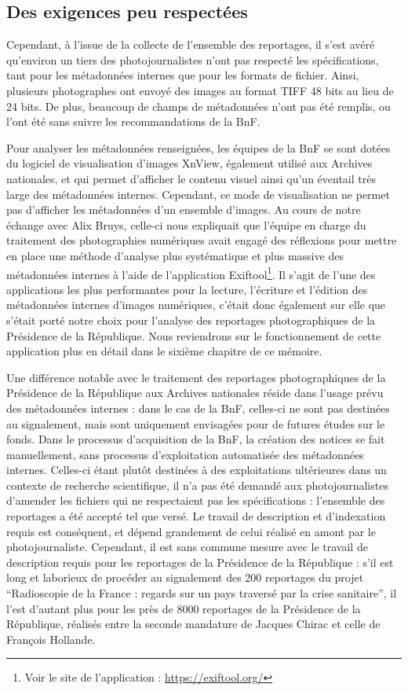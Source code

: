 \subsection*{Des exigences peu respectées}

Cependant, à l'issue de la collecte de l'ensemble des reportages, il s'est avéré qu'environ un tiers des photojournalistes n'ont pas respecté les spécifications, tant pour les métadonnées internes que pour les formats de fichier. Ainsi, plusieurs photographes ont envoyé des images au format TIFF 48 bits au lieu de 24 bits. De plus, beaucoup de champs de métadonnées n'ont pas été remplis, ou l'ont été sans suivre les recommandations de la BnF. 

Pour analyser les métadonnées renseignées, les équipes de la BnF se sont dotées du logiciel de visualisation d'images XnView, également utilisé aux Archives nationales, et qui permet d'afficher le contenu visuel ainsi qu'un éventail très large des métadonnées internes. Cependant, ce mode de visualisation ne permet pas d'afficher les métadonnées d'un ensemble d'images. Au cours de notre échange avec Alix Bruys, celle-ci nous expliquait que l'équipe en charge du traitement des photographies numériques avait engagé des réflexions pour mettre en place une méthode d'analyse plus systématique et plus massive des métadonnées internes à l'aide de l'application Exiftool\footnote{Voir le site de l'application : \url{https://exiftool.org/}}. Il s'agit de l'une des applications les plus performantes pour la lecture, l'écriture et l'édition des métadonnées internes d'images numériques, c'était donc également sur elle que s'était porté notre choix pour l'analyse des reportages photographiques de la Présidence de la République. Nous reviendrons sur le fonctionnement de cette application plus en détail dans le sixième chapitre de ce mémoire. 

Une différence notable avec le traitement des reportages photographiques de la Présidence de la République aux Archives nationales réside dans l'usage prévu des métadonnées internes : dans le cas de la BnF, celles-ci ne sont pas destinées au signalement, mais sont uniquement envisagées pour de futures études sur le fonds. Dans le processus d’acquisition de la BnF, la création des notices se fait manuellement, sans processus d'exploitation automatisée des métadonnées internes. Celles-ci étant plutôt destinées à des exploitations ultérieures dans un contexte de recherche scientifique, il n'a pas été demandé aux photojournalistes d'amender les fichiers qui ne respectaient pas les spécifications : l'ensemble des reportages a été accepté tel que versé. Le travail de description et d'indexation requis est conséquent, et dépend grandement de celui réalisé en amont par le photojournaliste. Cependant, il est sans commune mesure avec le travail de description requis pour les reportages de la Présidence de la République : s'il est long et laborieux de procéder au signalement des 200 reportages du projet \enquote{Radioscopie de la France : regards sur un pays traversé par la crise sanitaire}, il l'est d'autant plus pour les près de 8000 reportages de la Présidence de la République, réalisés entre la seconde mandature de Jacques Chirac et celle de François Hollande.
\\


